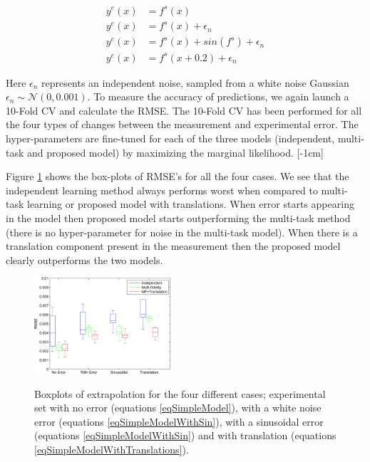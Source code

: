 \begin{align}
	y^{e}(x) & = f^{s}(x) \label{eqSimpleModel} \\
	y^{e}(x) & = f^{s}(x) + \epsilon_{n} \label{eqSimpleModelWithError} \\
	y^{e}(x) & = f^{s}(x) + sin(f^{s}) + \epsilon_{n} \label{eqSimpleModelWithSin} \\
	y^{e}(x) & = f^{s}(x + 0.2) + \epsilon_{n} \label{eqSimpleModelWithTranslations}
\end{align}

Here $\epsilon_{n}$ represents an independent noise, sampled from a white noise Gaussian $\epsilon_{n} \sim \mathcal{N}(0, 0.001)$. To measure the accuracy of predictions, we again launch a 10-Fold CV and calculate the RMSE. The 10-Fold CV has been performed for all the four types of changes between the measurement and experimental error. The hyper-parameters are fine-tuned for each of the three models (independent, multi-task and proposed model) by maximizing the marginal likelihood. 
[-1cm]

Figure \ref{figResultsOfExtrapolation} shows the box-plots of RMSE's for all the four cases. We see that the independent learning method always performs worst when compared to multi-task learning or proposed model with translations. When error starts appearing in the model then proposed model starts outperforming the multi-task method (there is no hyper-parameter for noise in the multi-task model). When there is a translation component present in the measurement then the proposed model clearly outperforms the two models.

\begin{figure}[!ht]
  \centering
        \includegraphics[width=0.45\textwidth]
        {images/part3/boxPlotsClAlphaAccuracyMeasure}
        \label{subFigboxPlotsClAlphaAccuracyMeasure}
       \caption{Boxplots of extrapolation for the four different cases; experimental set with no error (equations \ref{eqSimpleModel}), with a white noise error (equations \ref{eqSimpleModelWithSin}), with a sinusoidal error (equations \ref{eqSimpleModelWithSin}) and with translation (equations \ref{eqSimpleModelWithTranslations}). }
       \label{figResultsOfExtrapolation}
\end{figure}

